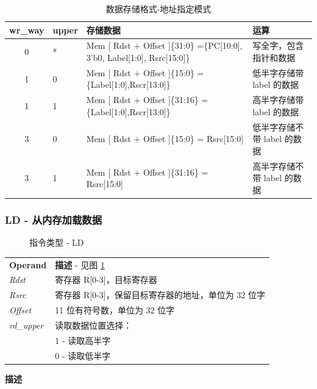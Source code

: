 \documentclass[main\_\_CN.tex]{subfiles}
\begin{document}
\begin{table}[!ht]
    \centering
    \begin{tabular}{ c l l l }
    \textbf{wr\_way}  & \textbf{upper} & \textbf{存储数据} & \textbf{运算}  \\ \hline
    0 &*&Mem [ Rdst + Offset ]\{31:0\} =\{PC[10:0], 3'b0, Label[1:0], Rsrc[15:0]\}  & 写全字，包含指针和数据 \\
    1 & 0 & Mem [ Rdst + Offset ]\{15:0\}  = \{Label[1:0],Rscr[13:0]\} & 低半字存储带 label 的数据\\
    1 & 1 & Mem [ Rdst + Offset ]\{31:16\} = \{Label[1:0],Rscr[13:0]\} & 高半字存储带 label 的数据\\
    3 & 0 & Mem [ Rdst + Offset ]\{15:0\}  =  Rsrc[15:0] &低半字存储不带 label 的数据  \\
    3 & 1 & Mem [ Rdst + Offset ]\{31:16\} = Rsrc[15:0]& 高半字存储不带 label 的数据  \\
    \end{tabular}
    \caption{数据存储格式-地址指定模式}
    \label{table:data_format-with-write_way}
\end{table}

\subsubsection {LD - 从内存加载数据}

%
%
%
%
%
%
%
\begin{figure}[!ht]
    \centering
    \caption{指令类型 - LD}
    \label{figure:LD}
\end{figure}

\begin{tabular}{ l l }
\textbf{Operand} & \textbf{描述} - 见图 \ref{figure:LD} \\
\textit{Rdst} & 寄存器 R[0-3]，目标寄存器\\
\textit{Rsrc} & 寄存器 R[0-3]，保留目标寄存器的地址，单位为 32 位字 \\
\textit{Offset} & 11 位有符号数，单位为 32 位字 \\
\textit{rd\_upper} & 读取数据位置选择： \\
 & 1 - 读取高半字\\
 & 0 - 读取低半字
\end{tabular}

\textbf{描述}
\end{document}
